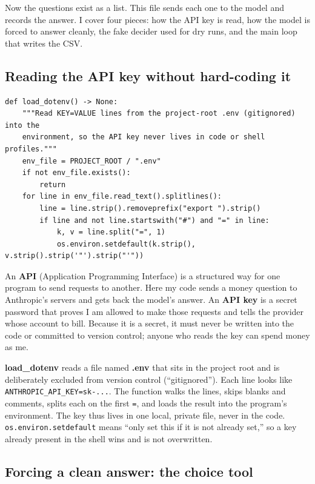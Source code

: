 \documentclass[11pt]{article}
\newcommand{\term}[1]{\textbf{\color{mossdk}#1}}
\newcommand{\file}[1]{\textbf{\ttfamily #1}}
\begin{document}
Now the questions exist as a list. This file sends each one to the model and records the answer. I
cover four pieces: how the API key is read, how the model is forced to answer cleanly, the fake
decider used for dry runs, and the main loop that writes the CSV.

\subsection{Reading the API key without hard-coding it}

\begin{lstlisting}[style=py,firstnumber=37]
def load_dotenv() -> None:
    """Read KEY=VALUE lines from the project-root .env (gitignored) into the
    environment, so the API key never lives in code or shell profiles."""
    env_file = PROJECT_ROOT / ".env"
    if not env_file.exists():
        return
    for line in env_file.read_text().splitlines():
        line = line.strip().removeprefix("export ").strip()
        if line and not line.startswith("#") and "=" in line:
            k, v = line.split("=", 1)
            os.environ.setdefault(k.strip(), v.strip().strip('"').strip("'"))
\end{lstlisting}

\begin{defbox}
An \term{API} (Application Programming Interface) is a structured way for one program to send requests
to another. Here my code sends a money question to Anthropic's servers and gets back the model's
answer. An \term{API key} is a secret password that proves I am allowed to make those requests and
tells the provider whose account to bill. Because it is a secret, it must never be written into the
code or committed to version control; anyone who reads the key can spend money as me.
\end{defbox}

\file{load\_dotenv} reads a file named \file{.env} that sits in the project root and is deliberately
excluded from version control (``gitignored''). Each line looks like \verb|ANTHROPIC_API_KEY=sk-...|.
The function walks the lines, skips blanks and comments, splits each on the first \verb|=|, and loads
the result into the program's environment. The key thus lives in one local, private file, never in the
code. \verb|os.environ.setdefault| means ``only set this if it is not already set,'' so a key already
present in the shell wins and is not overwritten.

\subsection{Forcing a clean answer: the choice tool}
\end{document}
